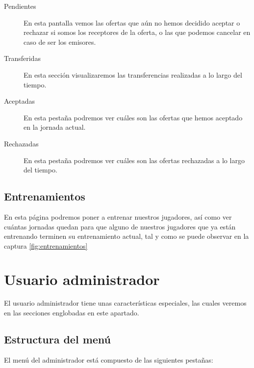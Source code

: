 \begin{description}
\item[Pendientes] En esta pantalla vemos las ofertas que aún no hemos decidido
  aceptar o rechazar si somos los receptores de la oferta, o las que podemos
  cancelar en caso de ser los emisores.
\item[Transferidas] En esta sección visualizaremos las transferencias realizadas
  a lo largo del tiempo.
\item[Aceptadas] En esta pestaña podremos ver cuáles son las ofertas que hemos
  aceptado en la jornada actual.
\item[Rechazadas] En esta pestaña podremos ver cuáles son las ofertas rechazadas
  a lo largo del tiempo.
\end{description}

\subsection{Entrenamientos}
\label{sec:entrenamientos}
En esta página podremos poner a entrenar nuestros jugadores, así como ver
cuántas jornadas quedan para que alguno de nuestros jugadores que ya están
entrenando terminen su entrenamiento actual, tal y como se puede observar en la
captura \ref{fig:entrenamientos}


\section{Usuario administrador}
El usuario administrador tiene unas características especiales, las cuales
veremos en las secciones englobadas en este apartado.
\subsection{Estructura del menú}
El menú del administrador está compuesto de las siguientes pestañas:

